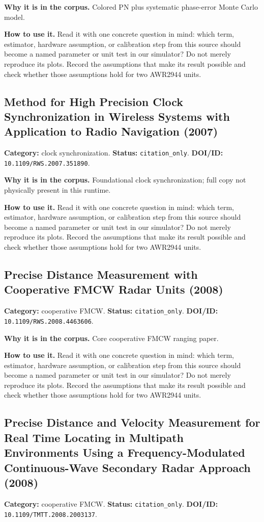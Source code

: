 \documentclass[11pt]{article}
\begin{document}
\textbf{Why it is in the corpus.} Colored PN plus systematic phase-error Monte Carlo model.

\textbf{How to use it.} Read it with one concrete question in mind: which term, estimator, hardware assumption, or calibration step from this source should become a named parameter or unit test in our simulator? Do not merely reproduce its plots. Record the assumptions that make its result possible and check whether those assumptions hold for two AWR2944 units.

\subsection*{Method for High Precision Clock Synchronization in Wireless Systems with Application to Radio Navigation (2007)}
\textbf{Category:} clock synchronization. \textbf{Status:} \nolinkurl{citation_only}. \textbf{DOI/ID:} \nolinkurl{10.1109/RWS.2007.351890}.

\textbf{Why it is in the corpus.} Foundational clock synchronization; full copy not physically present in this runtime.

\textbf{How to use it.} Read it with one concrete question in mind: which term, estimator, hardware assumption, or calibration step from this source should become a named parameter or unit test in our simulator? Do not merely reproduce its plots. Record the assumptions that make its result possible and check whether those assumptions hold for two AWR2944 units.

\subsection*{Precise Distance Measurement with Cooperative FMCW Radar Units (2008)}
\textbf{Category:} cooperative FMCW. \textbf{Status:} \nolinkurl{citation_only}. \textbf{DOI/ID:} \nolinkurl{10.1109/RWS.2008.4463606}.

\textbf{Why it is in the corpus.} Core cooperative FMCW ranging paper.

\textbf{How to use it.} Read it with one concrete question in mind: which term, estimator, hardware assumption, or calibration step from this source should become a named parameter or unit test in our simulator? Do not merely reproduce its plots. Record the assumptions that make its result possible and check whether those assumptions hold for two AWR2944 units.

\subsection*{Precise Distance and Velocity Measurement for Real Time Locating in Multipath Environments Using a Frequency-Modulated Continuous-Wave Secondary Radar Approach (2008)}
\textbf{Category:} cooperative FMCW. \textbf{Status:} \nolinkurl{citation_only}. \textbf{DOI/ID:} \nolinkurl{10.1109/TMTT.2008.2003137}.
\end{document}
